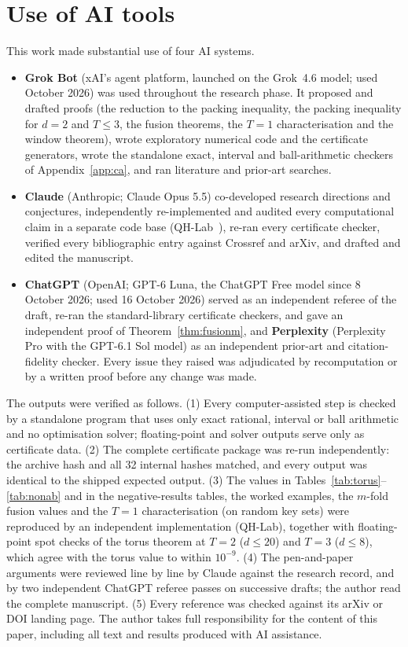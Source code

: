 \documentclass[11pt]{article}
\theoremstyle{definition}
\theoremstyle{remark}
\begin{document}
\section*{Use of AI tools}
This work made substantial use of four AI systems.
\begin{itemize}
\item \textbf{Grok Bot} (xAI's agent platform, launched on the Grok~4.6 model; used October 2026) was used throughout the research phase. It proposed and drafted proofs
(the reduction to the packing inequality, the packing inequality for $d=2$ and $T\le3$, the fusion theorems, the $T=1$ characterisation and the window theorem),
wrote exploratory numerical code and the certificate generators, wrote the standalone exact, interval and ball-arithmetic checkers of
Appendix~\ref{app:ca}, and ran literature and prior-art searches.
\item \textbf{Claude} (Anthropic; Claude Opus 5.5) co-developed research directions and conjectures, independently re-implemented
and audited every computational claim in a separate code base (QH-Lab~\cite{QHLab}), re-ran every certificate checker, verified
every bibliographic entry against Crossref and arXiv, and drafted and edited the manuscript.
\item \textbf{ChatGPT} (OpenAI; GPT-6 Luna, the ChatGPT Free model since 8 October 2026; used 16 October 2026) served as an independent referee of the draft, re-ran the standard-library certificate checkers, and gave an independent proof of
Theorem~\ref{thm:fusionm}, and \textbf{Perplexity}
(Perplexity Pro with the GPT-6.1 Sol model) as an independent prior-art and citation-fidelity checker. Every issue they raised was adjudicated by
recomputation or by a written proof before any change was made.
\end{itemize}
The outputs were verified as follows. (1) Every computer-assisted step is checked by a standalone program that uses only exact
rational, interval or ball arithmetic and no optimisation solver; floating-point and solver outputs serve only as certificate data.
(2) The complete certificate package was re-run independently: the archive hash and all 32 internal hashes matched, and every output
was identical to the shipped expected output. (3) The values in Tables~\ref{tab:torus}--\ref{tab:nonab} and in the negative-results tables, the worked examples, the $m$-fold fusion values
and the $T=1$ characterisation (on random key sets) were reproduced by an independent implementation (QH-Lab), together with floating-point spot checks of the torus theorem at $T=2$ ($d\le20$) and $T=3$ ($d\le8$), which agree with the
torus value to within $10^{-9}$. (4) The pen-and-paper arguments were reviewed line by line by Claude against the research record, and by two independent ChatGPT
referee passes on successive drafts; the author read the complete manuscript.
(5) Every reference was checked against its arXiv or DOI landing page.
The author takes full responsibility for the content of this paper, including all text and results produced with AI assistance.
\end{document}
